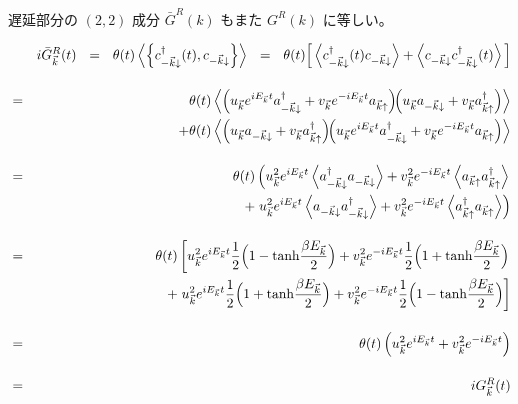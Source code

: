 \documentclass[uplatex,a4j,12pt,dvipdfmx]{jsarticle}
\begin{document}
遅延部分の $(2,2)$ 成分 $\bar{G}^{R}(k)$ もまた $G^{R}(k)$ に等しい。

\begin{eqnarray}
	&&
	i
	\bar{G}_{\vec{k}}^{R}(t)
	\ \ = \ \
	\theta(t)
	\left\langle \left\{
	c_{-\vec{k} \downarrow}^{\dagger}(t), c_{-\vec{k} \downarrow}
	\right\} \right\rangle
	\ \ = \ \
	\theta(t)
	\Big[
		\left\langle
		c_{-\vec{k} \downarrow}^{\dagger}(t) c_{-\vec{k} \downarrow}
		\right\rangle
		+
		\left\langle
		c_{-\vec{k} \downarrow} c_{-\vec{k} \downarrow}^{\dagger}(t)
		\right\rangle
		\Big]
	\nonumber \\[4mm] &=&
	\theta(t)
	\left\langle
	\left(
	u_{\vec{k}} e^{ i E_{\vec{k}} t }
	a_{-\vec{k} \downarrow}^{\dagger}
	+
	v_{\vec{k}} e^{ - i E_{\vec{k}} t }
	a_{\vec{k} \uparrow}
	\right)
	\!\!
	\left(
	u_{\vec{k}}
	a_{-\vec{k} \downarrow}
	+
	v_{\vec{k}}
	a_{\vec{k} \uparrow}^{\dagger}
	\right)
	\right\rangle
	\nonumber \\ && \hspace{5mm} +
	\theta(t)
	\left\langle
	\left(
	u_{\vec{k}}
	a_{-\vec{k} \downarrow}
	+
	v_{\vec{k}}
	a_{\vec{k} \uparrow}^{\dagger}
	\right)
	\!\!
	\left(
	u_{\vec{k}} e^{ i E_{\vec{k}} t }
	a_{-\vec{k} \downarrow}^{\dagger}
	+
	v_{\vec{k}} e^{ - i E_{\vec{k}} t }
	a_{\vec{k} \uparrow}
	\right)
	\right\rangle
	\nonumber \\[4mm]
	&=&
	\theta(t)
	\left(
	u_{\vec{k}}^{2}
	e^{ i E_{\vec{k}} t }
	\left\langle
	a_{-\vec{k} \downarrow}^{\dagger}
	a_{-\vec{k} \downarrow}
	\right\rangle
	+
	v_{\vec{k}}^{2}
	e^{ - i E_{\vec{k}} t }
	\left\langle
	a_{\vec{k} \uparrow}
	a_{\vec{k} \uparrow}^{\dagger}
	\right\rangle
	\right.
	\nonumber \\ && \hspace{5mm} +
	\left.
	u_{\vec{k}}^{2}
	e^{ i E_{\vec{k}} t }
	\left\langle
	a_{-\vec{k} \downarrow}
	a_{-\vec{k} \downarrow}^{\dagger}
	\right\rangle
	+
	v_{\vec{k}}^{2}
	e^{ - i E_{\vec{k}} t }
	\left\langle
	a_{\vec{k} \uparrow}^{\dagger}
	a_{\vec{k} \uparrow}
	\right\rangle
	\right)
	\nonumber \\[4mm]
	&=&
	\theta(t)
	\left[
		u_{\vec{k}}^{2}
		e^{ i E_{\vec{k}} t }
		\dfrac{1}{2}
		\Big( 1 - {\rm tanh}\dfrac{\beta E_{\vec{k}}}{2} \Big)
		+
		v_{\vec{k}}^{2}
		e^{ - i E_{\vec{k}} t }
		\dfrac{1}{2}
		\Big( 1 + {\rm tanh}\dfrac{\beta E_{\vec{k}}}{2} \Big)
		\right.
		\nonumber \\ && \hspace{5mm} +
		\left.
		u_{\vec{k}}^{2}
		e^{ i E_{\vec{k}} t }
		\dfrac{1}{2}
		\Big( 1 + {\rm tanh}\dfrac{\beta E_{\vec{k}}}{2} \Big)
		+
		v_{\vec{k}}^{2}
		e^{ - i E_{\vec{k}} t }
		\dfrac{1}{2}
		\Big( 1 - {\rm tanh}\dfrac{\beta E_{\vec{k}}}{2} \Big)
		\right]
	\nonumber \\[4mm] &=&
	\theta(t)
	\left(
	u_{\vec{k}}^{2}
	e^{ i E_{\vec{k}} t }
	+
	v_{\vec{k}}^{2}
	e^{ - i E_{\vec{k}} t }
	\right)
	\nonumber \\[4mm] &=&
	i
	G_{\vec{k}}^{R}(t)
\end{eqnarray}
\end{document}
